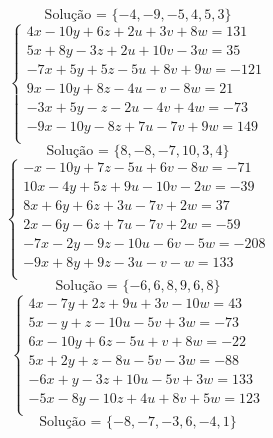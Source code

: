 \documentclass[12pt,oneside,a4paper]{article}
\begin{document}
\begin{equation*}
\text{Solução = }\{-4,-9,-5,4,5,3\}
\end{equation*}
\vspace{\baselineskip}
\begin{equation*}
\begin{cases}
4x-10y+6z+2u+3v+8w=131 \\
5x+8y-3z+2u+10v-3w=35 \\
-7x+5y+5z-5u+8v+9w=-121 \\
9x-10y+8z-4u-v-8w=21 \\
-3x+5y-z-2u-4v+4w=-73 \\
-9x-10y-8z+7u-7v+9w=149 \\
\end{cases}
\end{equation*}
\begin{equation*}
\text{Solução = }\{8,-8,-7,10,3,4\}
\end{equation*}
\vspace{\baselineskip}
\begin{equation*}
\begin{cases}
-x-10y+7z-5u+6v-8w=-71 \\
10x-4y+5z+9u-10v-2w=-39 \\
8x+6y+6z+3u-7v+2w=37 \\
2x-6y-6z+7u-7v+2w=-59 \\
-7x-2y-9z-10u-6v-5w=-208 \\
-9x+8y+9z-3u-v-w=133 \\
\end{cases}
\end{equation*}
\begin{equation*}
\text{Solução = }\{-6,6,8,9,6,8\}
\end{equation*}
\vspace{\baselineskip}
\begin{equation*}
\begin{cases}
4x-7y+2z+9u+3v-10w=43 \\
5x-y+z-10u-5v+3w=-73 \\
6x-10y+6z-5u+v+8w=-22 \\
5x+2y+z-8u-5v-3w=-88 \\
-6x+y-3z+10u-5v+3w=133 \\
-5x-8y-10z+4u+8v+5w=123 \\
\end{cases}
\end{equation*}
\begin{equation*}
\text{Solução = }\{-8,-7,-3,6,-4,1\}
\end{equation*}
\end{document}
